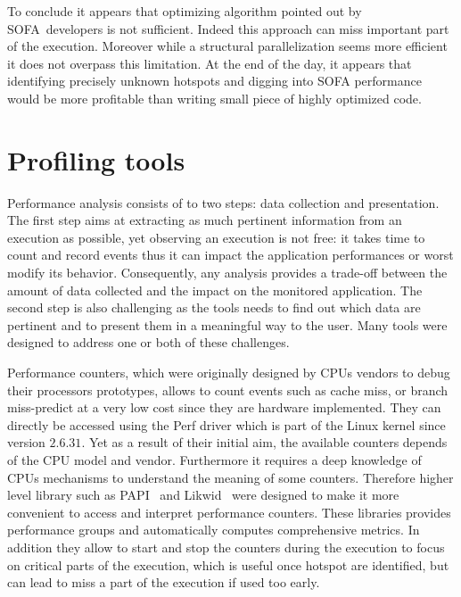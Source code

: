 %
To conclude it appears that optimizing algorithm pointed out by \gls{SOFA} developers is not sufficient.
Indeed this approach can miss important part of the execution.
Moreover while a structural parallelization seems more efficient it does not overpass this limitation.
At the end of the day, it appears that identifying precisely unknown hotspots and digging into \gls{SOFA} performance would be more profitable than writing small piece of highly optimized code.

\section{Profiling tools}
\label{sec:prof-tools}

Performance analysis consists of to two steps: data collection and presentation.
The first step aims at extracting as much pertinent information from an execution as possible, yet observing an execution is not free: it takes time to count and record events thus it can impact the application performances or worst modify its behavior.
Consequently, any analysis provides a trade-off between the amount of data collected and the impact on the monitored application.
The second step is also challenging as the tools needs to find out which data are pertinent and to present them in a meaningful way to the user.
Many tools were designed to address one or both of these challenges.

Performance counters, which were originally designed by \glspl{CPU} vendors to debug their processors prototypes, allows to count events such as cache miss, or branch miss-predict at a very low cost since they are hardware implemented.
They can directly be accessed using the \gls{Perf} driver which is part of the \gls{Linux} kernel since version $2.6.31$.
Yet as a result of their initial aim, the available counters depends of the \gls{CPU} model and vendor.
Furthermore it requires a deep knowledge of \glspl{CPU} mechanisms to understand the meaning of some counters.
Therefore higher level library such as \gls{PAPI}~\cite{Browne00Portable,Malony11Parallel,Weaver13PAPI} and \gls{Likwid}~\cite{Treibig10LIKWID} were designed to make it more convenient to access and interpret performance counters.
These libraries provides performance groups and automatically computes comprehensive metrics.
In addition they allow to start and stop the counters during the execution to focus on critical parts of the execution, which is useful once hotspot are identified, but can lead to miss a part of the execution if used too early.


